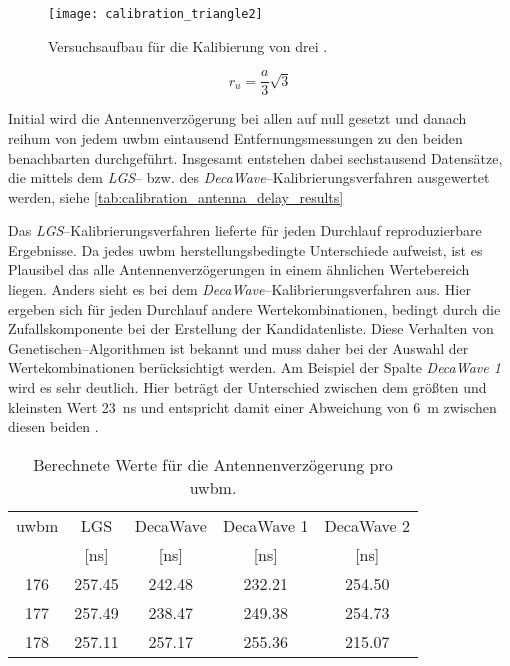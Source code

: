 \begin{figure}[h]
	\centering
	\texttt{[image: calibration\_triangle2]}
	\caption{Versuchsaufbau für die Kalibierung von drei .}
	\label{fig:calibration_triangle2}
\end{figure}

\begin{equation}
r_u = \frac{a}{3} \sqrt{3} \label{eq:dreieck_seitenlaenge_aus_umkreis}
\end{equation}

Initial wird die Antennenverzögerung bei allen  auf null gesetzt und danach reihum von jedem \Gls{uwbm} eintausend Entfernungsmessungen zu den beiden benachbarten  durchgeführt. Insgesamt entstehen dabei sechstausend Datensätze, die mittels dem \textit{LGS}-- bzw. des \textit{DecaWave}--Kalibrierungsverfahren ausgewertet werden, siehe \autoref{tab:calibration_antenna_delay_results}

Das \textit{LGS}--Kalibrierungsverfahren lieferte für jeden Durchlauf reproduzierbare Ergebnisse. Da jedes \Gls{uwbm} herstellungsbedingte Unterschiede aufweist, ist es Plausibel das alle Antennenverzögerungen in einem ähnlichen Wertebereich liegen. Anders sieht es bei dem \textit{DecaWave}--Kalibrierungsverfahren aus. Hier ergeben sich für jeden Durchlauf andere Wertekombinationen, bedingt durch die Zufallskomponente bei der Erstellung der Kandidatenliste. Diese Verhalten von Genetischen--Algorithmen ist bekannt und muss daher bei der Auswahl der Wertekombinationen berücksichtigt werden. Am Beispiel der Spalte \textit{DecaWave 1} wird es sehr deutlich. Hier beträgt der Unterschied zwischen dem größten und kleinsten Wert \approx\SI{23}{\ns} und entspricht damit einer Abweichung von \approx\SI{6}{\meter} zwischen diesen beiden .

\begin{table}[h]
	\centering
	\begin{tabular}{||c||c||ccc||}
\hline
\Gls{uwbm} & LGS & DecaWave & DecaWave 1 & DecaWave 2 \\
& [\si{\nano\second}] & [\si{\nano\second}] & [\si{\nano\second}] & [\si{\nano\second}] \\
\hline
\hline
176 & \num{257.45} & \num{242.48} & \num{232.21} & \num{254.50} \\
177 & \num{257.49} & \num{238.47} & \num{249.38} & \num{254.73} \\
178 & \num{257.11} & \num{257.17} & \num{255.36} & \num{215.07} \\
\hline
	\end{tabular}
	\caption{Berechnete Werte für die Antennenverzögerung pro \Gls{uwbm}.}
	\label{tab:calibration_antenna_delay_results}
\end{table}

